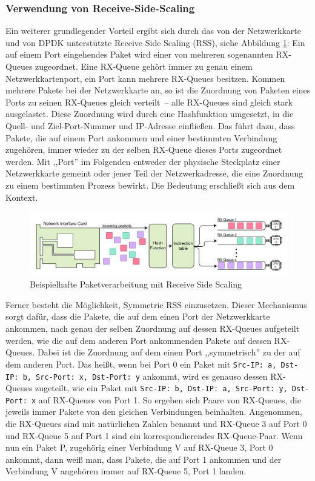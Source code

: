 \documentclass[../review_3.tex]{subfiles}
\begin{document}
\subsubsection{Verwendung von Receive-Side-Scaling}
Ein weiterer grundlegender Vorteil ergibt sich durch das von der Netzwerkkarte und von DPDK unterstützte Receive Side Scaling (RSS), siehe Abbildung \ref{fig:Receive-Side-Scaling}: Ein auf einem Port eingehendes Paket wird einer von mehreren sogenannten RX-Queues zugeordnet. Eine RX-Queue gehört immer zu genau einem Netzwerkkartenport, ein Port kann mehrere RX-Queues besitzen. Kommen mehrere Pakete bei der Netzwerkkarte an, so ist die Zuordnung von Paketen eines Ports zu seinen RX-Queues gleich verteilt~-- alle RX-Queues sind gleich stark ausgelastet. Diese Zuordnung wird durch eine Hashfunktion umgesetzt, in die Quell- und Ziel-Port-Nummer und IP-Adresse einfließen. Das führt dazu, dass Pakete, die auf einem Port ankommen und einer bestimmten Verbindung zugehören, immer wieder zu der selben RX-Queue dieses Ports zugeordnet werden. Mit ,,Port'' im Folgenden entweder der physische Steckplatz einer Netzwerkkarte gemeint oder jener Teil der Netzwerkadresse, die eine Zuordnung zu einem bestimmten Prozess bewirkt. Die Bedeutung erschließt sich aus dem Kontext.

\begin{figure}[H]
    \centering
    \includegraphics[width=0.95\linewidth]{img/Receive-Side-Scaling.png}
    \caption{Beispielhafte Paketverarbeitung mit Receive Side Scaling}
    \label{fig:Receive-Side-Scaling}
\end{figure}

Ferner besteht die Möglichkeit, Symmetric RSS einzusetzen. Dieser Mechanismus sorgt dafür, dass die Pakete, die auf dem einen Port der Netzwerkkarte ankommen, nach genau der selben Zuordnung auf dessen RX-Queues aufgeteilt werden, wie die auf dem anderen Port ankommenden Pakete auf dessen RX-Queues. Dabei ist die Zuordnung auf dem einen Port ,,symmetrisch'' zu der auf dem anderen Port. Das heißt, wenn bei Port 0 ein Paket mit \texttt{Src-IP: a, Dst-IP: b, Src-Port: x, Dst-Port: y} ankommt, wird es genauso dessen RX-Queues zugeteilt, wie ein Paket mit \texttt{Src-IP: b, Dst-IP: a, Src-Port: y, Dst-Port: x} auf RX-Queues von Port 1. So ergeben sich Paare von RX-Queues, die jeweils immer Pakete von den gleichen Verbindungen beinhalten. Angenommen, die RX-Queues sind mit natürlichen Zahlen benannt und RX-Queue 3 auf Port 0 und RX-Queue 5 auf Port 1 sind ein korrespondierendes RX-Queue-Paar. Wenn nun ein Paket P, zugehörig einer Verbindung V auf RX-Queue 3, Port 0 ankommt, dann weiß man, dass Pakete, die auf Port 1 ankommen und der Verbindung V angehören immer auf RX-Queue 5, Port 1 landen.
\end{document}
